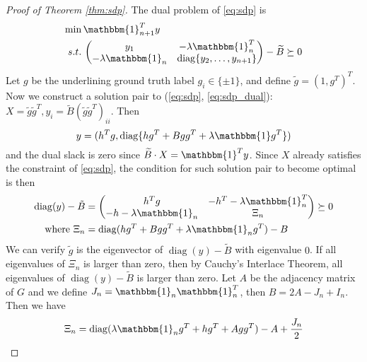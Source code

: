 \documentclass[conference]{IEEEtran}
\DeclareMathOperator{\diag}{diag}
\begin{document}
	\begin{proof}[Proof of Theorem \ref{thm:sdp}]
		The dual problem of \eqref{eq:sdp} is
		\begin{align}
		\min\, & \mathbbm{1}^T_{n+1} y \notag \\
		s.t.\,& \begin{pmatrix}y_1 & -\lambda\mathbbm{1}^T_n \\ -\lambda\mathbbm{1}_n & \diag\{y_2, \dots, y_{n+1}\} \end{pmatrix} - \widetilde{B} \succeq 0
		\label{eq:sdp_dual}
		\end{align}
Let $g$ be the underlining ground truth label $g_i \in \{\pm 1\}$, and
define $\tilde{g} = (1,g^T)^T$.
Now we construct a solution pair to (\ref{eq:sdp}, \ref{eq:sdp_dual}): $X=\tilde{g}\tilde{g}^T, y_i = \tilde{B}(\tilde{g}\tilde{g}^T)_{ii}$.
Then $$
y = (h^T g, \diag\{hg^T+Bgg^T +\lambda \mathbbm{1}g^T\})
$$
and the dual slack is zero since $\widetilde{B} \cdot X = \mathbbm{1}^T y $.
Since $X$ already satisfies the constraint of \eqref{eq:sdp}, the condition for such solution pair to become optimal is then
\begin{align}
\diag(y) - \tilde{B} & = \begin{pmatrix} h^T g & -h^T - \lambda \mathbbm{1}_n^T \\ -h- \lambda \mathbbm{1}_n & \Xi_n \end{pmatrix}
\succeq 0 \notag \\
\textrm{ where }\Xi_n & = \diag(hg^T + Bgg^T + \lambda \mathbbm{1}_ng^T) - B
\end{align}
		We can verify $\tilde{g}$ is the eigenvector of $\diag(y) - \tilde{B}$ with eigenvalue $0$.
		If all eigenvalues of $\Xi_n$ is larger than zero, then by
		Cauchy’s Interlace Theorem, all eigenvalues of $\diag(y) - \tilde{B}$ is larger than zero.
		Let $A$ be the adjacency matrix of $G$
		and we define $J_n = \mathbbm{1}_n \mathbbm{1}_n^T $, then $B=2A-J_n+I_n$.
		Then we have
		\begin{equation}\label{eq:Xi_n}
		\Xi_n = \diag(\lambda \mathbbm{1}_n g^T + hg^T + Agg^T) - A + \frac{J_n}{2}
		\end{equation}
		

\end{proof}
\end{document}
